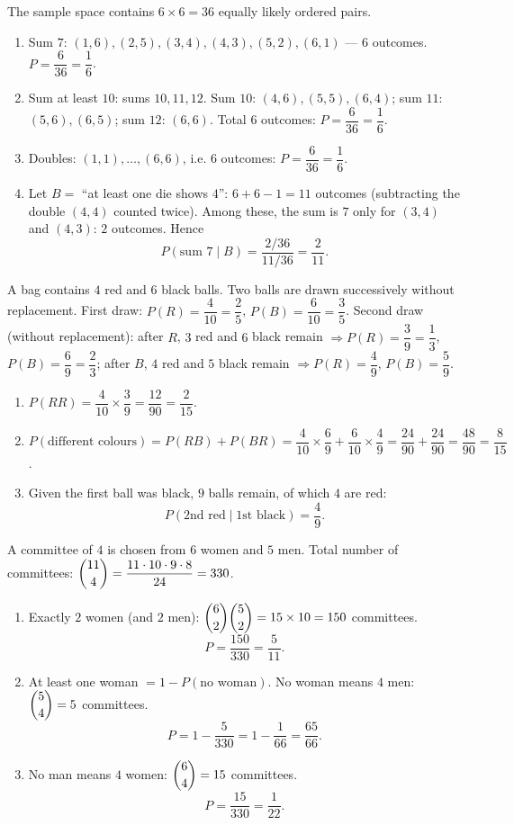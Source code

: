 \documentclass[11pt]{article}
\newcounter{popsec}
\newcounter{popsub}
\newcommand{\courssub}[1]{%
  \stepcounter{popsub}%
  \par\vspace{9pt}\noindent{\popxbold\fontsize{11.5}{13}\selectfont\color{popink}{\color{poporange}\thepopsec.\thepopsub}\hspace{6pt}#1}\par\nopagebreak\vspace{4pt}
}
\begin{document}
\courssub{I practise}

\begin{corrige}
The sample space contains $6\times 6=36$ equally likely ordered pairs.
\begin{enumerate}
\item Sum $7$: $(1,6),(2,5),(3,4),(4,3),(5,2),(6,1)$ --- $6$ outcomes. $P=\dfrac{6}{36}=\dfrac{1}{6}$.
\item Sum at least $10$: sums $10,11,12$. Sum $10$: $(4,6),(5,5),(6,4)$; sum $11$: $(5,6),(6,5)$; sum $12$: $(6,6)$. Total $6$ outcomes: $P=\dfrac{6}{36}=\dfrac{1}{6}$.
\item Doubles: $(1,1),\dots,(6,6)$, i.e. $6$ outcomes: $P=\dfrac{6}{36}=\dfrac{1}{6}$.
\item Let $B=$ ``at least one die shows $4$'': $6+6-1=11$ outcomes (subtracting the double $(4,4)$ counted twice). Among these, the sum is $7$ only for $(3,4)$ and $(4,3)$: $2$ outcomes. Hence
\[P(\text{sum }7\mid B)=\dfrac{2/36}{11/36}=\dfrac{2}{11}.\]
\end{enumerate}
\end{corrige}

\begin{corrige}
A bag contains $4$ red and $6$ black balls. Two balls are drawn successively without replacement.
First draw: $P(R)=\dfrac{4}{10}=\dfrac25$, $P(B)=\dfrac{6}{10}=\dfrac35$.
Second draw (without replacement): after $R$, $3$ red and $6$ black remain $\Rightarrow P(R)=\dfrac39=\dfrac13$, $P(B)=\dfrac69=\dfrac23$; after $B$, $4$ red and $5$ black remain $\Rightarrow P(R)=\dfrac49$, $P(B)=\dfrac59$.
\begin{enumerate}
\item $P(RR)=\dfrac{4}{10}\times\dfrac{3}{9}=\dfrac{12}{90}=\dfrac{2}{15}$.
\item $P(\text{different colours})=P(RB)+P(BR)=\dfrac{4}{10}\times\dfrac{6}{9}+\dfrac{6}{10}\times\dfrac{4}{9}=\dfrac{24}{90}+\dfrac{24}{90}=\dfrac{48}{90}=\dfrac{8}{15}$.
\item Given the first ball was black, $9$ balls remain, of which $4$ are red:
\[P(\text{2nd red}\mid\text{1st black})=\dfrac{4}{9}.\]
\end{enumerate}
\end{corrige}

\begin{corrige}
A committee of $4$ is chosen from $6$ women and $5$ men.
Total number of committees: $\dbinom{11}{4}=\dfrac{11\cdot10\cdot9\cdot8}{24}=330$.
\begin{enumerate}
\item Exactly $2$ women (and $2$ men): $\dbinom{6}{2}\dbinom{5}{2}=15\times 10=150$ committees.
\[P=\dfrac{150}{330}=\dfrac{5}{11}.\]
\item At least one woman $=1-P(\text{no woman})$. No woman means $4$ men: $\dbinom{5}{4}=5$ committees.
\[P=1-\dfrac{5}{330}=1-\dfrac{1}{66}=\dfrac{65}{66}.\]
\item No man means $4$ women: $\dbinom{6}{4}=15$ committees.
\[P=\dfrac{15}{330}=\dfrac{1}{22}.\]
\end{enumerate}
\end{corrige}
\end{document}
